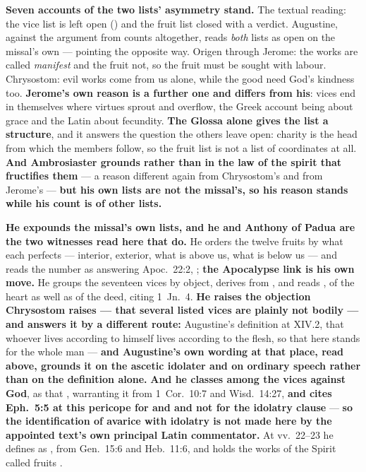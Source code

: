 \textbf{Seven accounts of the two lists' asymmetry stand.} The
textual reading: the vice list is left open () and the fruit list closed with a verdict. Augustine, against the
argument from counts altogether, reads \emph{both} lists as open on the
missal's own  --- pointing the opposite way.
Origen through Jerome: the works are called \emph{manifest} and the fruit not,
so the fruit must be sought with labour. Chrysostom: evil works come from us
alone, while the good need God's kindness too. \textbf{Jerome's own reason is
a further one and differs from his}: vices end in themselves where virtues
sprout and overflow, the Greek account being about grace and the Latin about
fecundity.
\textbf{The Glossa alone gives the list a structure}, and it
answers the question the others leave open: charity is the head from which the
members follow, so the fruit list is not a list of coordinates at all.
\textbf{And Ambrosiaster grounds  rather than  in
the law of the spirit that fructifies them} --- a reason different again from
Chrysostom's and from Jerome's --- \textbf{but his own lists are not the
missal's, so his reason stands while his count is of other lists.}

\begin{witnessnote}
\textbf{He expounds the missal's own lists, and he and Anthony of Padua are the
two witnesses read here that do.} He orders the twelve fruits by what each perfects ---
interior, exterior, what is above us, what is below us --- and reads the number
as answering Apoc.\ 22:2, ; \textbf{the Apocalypse link is his own move.} He groups the seventeen vices by
object, derives  from , and reads
 , of the heart as well as of the deed,
citing 1~Jn.\ 4. \textbf{He raises the objection Chrysostom raises --- that
several listed vices are plainly not bodily --- and answers it by a different
route:} Augustine's definition at  XIV.2, that whoever
lives according to himself lives according to the flesh, so that 
here stands for the whole man --- \textbf{and Augustine's own wording at that
place, read above, grounds it on the ascetic idolater and on ordinary speech
rather than on the definition alone.} \textbf{And he classes  among the vices against God}, as that , warranting it from 1~Cor.\ 10:7 and Wisd.\ 14:27,
\textbf{and cites Eph.\ 5:5 at this pericope for  and
 and not for the idolatry clause} --- \textbf{so the
identification of avarice with idolatry is not made here by the appointed text's
own principal Latin commentator.} At vv.~22--23 he defines  as
, from Gen.\ 15:6 and
Heb.\ 11:6, and holds the works of the Spirit called fruits .
\end{witnessnote}

